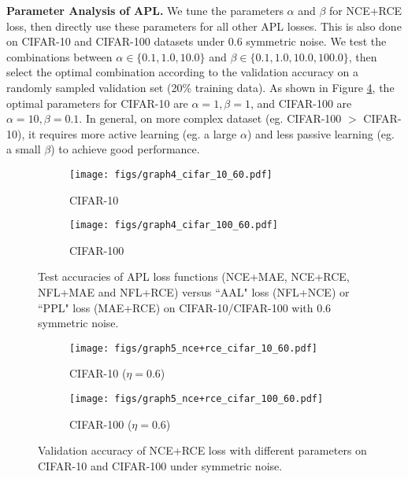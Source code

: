 \documentclass{article}
\begin{document}
\textbf{Parameter Analysis of APL.} We tune the parameters $\alpha$ and $\beta$ for NCE+RCE loss, then directly use these parameters for all other APL losses. This is also done on CIFAR-10 and CIFAR-100 datasets under 0.6 symmetric noise. 
We test the combinations between $\alpha \in \{0.1, 1.0, 10.0\}$ and $\beta \in \{0.1, 1.0, 10.0, 100.0\}$, then select the optimal combination according to the validation accuracy on a randomly sampled validation set (20\% training data). As shown in Figure \ref{fig:5}, the optimal parameters for CIFAR-10 are $\alpha=1, \beta=1$, and CIFAR-100 are $\alpha=10, \beta=0.1$. In general, on more complex dataset (eg. CIFAR-100 $>$ CIFAR-10), it requires more active learning (eg. a large $\alpha$) and less passive learning (eg. a small $\beta$) to achieve good performance.


\begin{figure}[!t]
	\centering
	\begin{subfigure}{0.48\linewidth}
		\texttt{[image: figs/graph4\_cifar\_10\_60.pdf]}
		\caption{CIFAR-10}
		\label{ce_nce_combo}
	\end{subfigure}
	\begin{subfigure}{0.48\linewidth} 
		\texttt{[image: figs/graph4\_cifar\_100\_60.pdf]}
		\caption{CIFAR-100}
		\label{fl_nfl_combo}
	\end{subfigure}
	\vspace{-0.1 in}
	\caption{Test accuracies of APL loss functions (NCE+MAE, NCE+RCE, NFL+MAE and NFL+RCE) versus ``AAL" loss (NFL+NCE) or ``PPL" loss (MAE+RCE) on CIFAR-10/CIFAR-100 with 0.6 symmetric noise.}
	\label{fig:4}
\end{figure}

\begin{figure}[!t]
	\centering
	\begin{subfigure}{0.48\linewidth}
		\texttt{[image: figs/graph5\_nce+rce\_cifar\_10\_60.pdf]}
		\caption{CIFAR-10 ($\eta=0.6$)}
	\end{subfigure}
	\begin{subfigure}{0.48\linewidth}
		\texttt{[image: figs/graph5\_nce+rce\_cifar\_100\_60.pdf]}
		\caption{CIFAR-100 ($\eta=0.6$)}
	\end{subfigure}
	\vspace{-0.1 in}
	\caption{Validation accuracy of NCE+RCE loss with different parameters on CIFAR-10 and CIFAR-100 under symmetric noise.}
 	\vspace{-0.15 in}
	\label{fig:5}
\end{figure}
\end{document}
